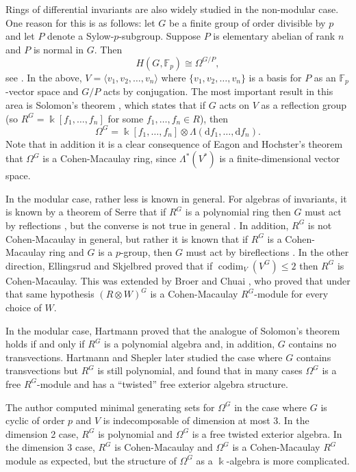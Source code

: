 \documentclass[a4paper]{amsart}
\newcommand{\F}{\mathbb{F}}
\newcommand{\kk}{\Bbbk}
\newcommand{\dd}{\mathrm{d}}
\def\codim{\operatorname{codim}}
\newtheorem*{Corollary of Conjecture}{Corollary of Conjecture}
\theoremstyle{definition}
\theoremstyle{remark}
\theoremstyle{Acknowledgments}
\begin{document}
Rings of differential invariants are also widely studied in the non-modular case. One reason for this is as follows: let $G$ be a finite group of order divisible by $p$ and let $P$ denote a Sylow-$p$-subgroup. Suppose $P$ is elementary abelian of rank $n$ and $P$ is normal in $G$. Then 
\[H(G,\F_p) \cong \Omega^{G/P},\]
see \cite[Section~5.1]{Benson}.
In the above, $V = \langle v_1,v_2, \ldots, v_n \rangle$ where $\{v_1, v_2, \ldots, v_n\}$ is a basis for $P$ as an $\F_p$-vector space and $G/P$ acts by conjugation.
The most important result in this area is Solomon's theorem \cite[Theorem~7.3.1]{Benson}, which states that if $G$ acts on $V$ as a reflection group (so $R^G = \kk[f_1, \ldots, f_n]$ for some $f_1, \ldots, f_n \in R$), then
\[\Omega^G = \kk[f_1, \ldots, f_n] \otimes \Lambda (\dd f_1, \ldots, \dd f_n).\]
Note that in addition it is a clear consequence of Eagon and Hochster's theorem that $\Omega^G$ is a Cohen-Macaulay ring, since $\Lambda^*(V^*)$ is a finite-dimensional vector space.

In the modular case, rather less is known in general. For algebras of invariants, it is known by a theorem of Serre that if $R^G$ is a polynomial ring then $G$ must act by reflections \cite[Theorem~3.7.8]{DerksenKemper}, but the converse is not true in general \cite{KemperOnCM}. In addition, $R^G$ is not Cohen-Macaulay in general, but rather it is known that if $R^G$ is a Cohen-Macaulay ring and $G$ is a $p$-group, then $G$ must act by bireflections \cite{KemperOnCM}. In the other direction, Ellingsrud and Skjelbred \cite{Ellingsrud} proved that if $\codim_V(V^G) \leq 2$ then $R^G$ is Cohen-Macaulay. This was extended by Broer and Chuai \cite{BroerChuaiRelative}, who proved that under that same hypothesis $(R \otimes W)^G$ is a Cohen-Macaulay $R^G$-module for every choice of $W$.

In the modular case, Hartmann \cite{Hartmann} proved that the analogue of Solomon's theorem holds if and only if $R^G$ is a polynomial algebra and, in addition, $G$ contains no transvections. Hartmann and Shepler \cite{HartmannShepler} later studied the case where $G$ contains transvections but $R^G$ is still polynomial, and found that in many cases $\Omega^G$ is a free $R^G$-module and has a ``twisted'' free exterior algebra structure. 

The author \cite{ElmerCMCov} computed minimal generating sets for $\Omega^G$ in the case where $G$ is cyclic of order $p$ and $V$ is indecomposable of dimension at most 3. In the dimension 2 case, $R^G$ is polynomial and $\Omega^G$ is a free twisted exterior algebra. In the dimension 3 case, $R^G$ is Cohen-Macaulay and $\Omega^G$ is a Cohen-Macaulay $R^G$ module as expected, but the structure of $\Omega^G$ as a $\kk$-algebra is more complicated.
\end{document}
